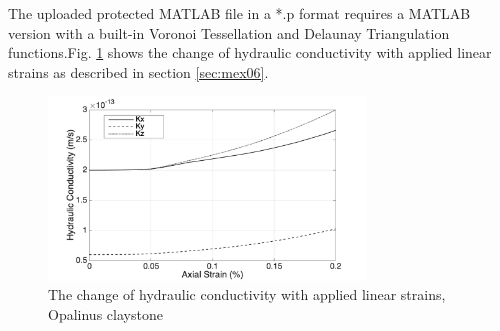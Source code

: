 The uploaded protected MATLAB file in a *.p format requires a MATLAB version with a built-in Voronoi Tessellation and Delaunay Triangulation functions.Fig. \ref{fig:Amir_ME6_Lattice_Drying_Data} shows the change of hydraulic conductivity with applied linear strains as described in section \ref {sec:mex06}. 

\begin{figure}[!ht]
\centering
\includegraphics[width=0.75\textwidth]{figures/Amir_ME6_Lattice_Drying_Data.png}
\caption{The change of hydraulic conductivity with applied linear strains, Opalinus claystone}
\label{fig:Amir_ME6_Lattice_Drying_Data}
\end{figure}


